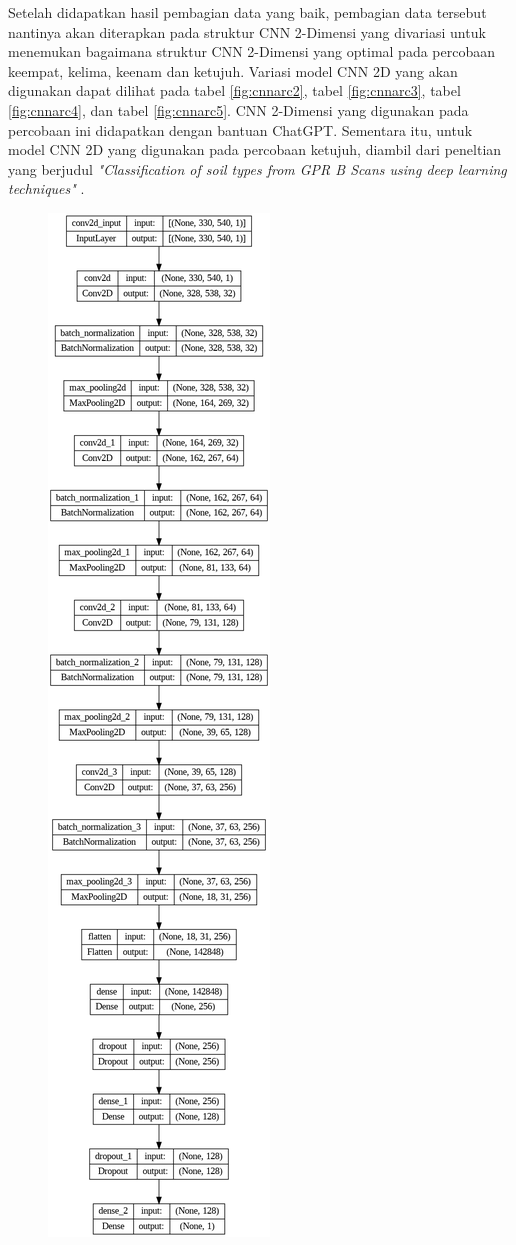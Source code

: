 Setelah didapatkan hasil pembagian data yang baik, pembagian data tersebut nantinya akan diterapkan pada struktur CNN 2-Dimensi yang divariasi untuk menemukan bagaimana struktur CNN 2-Dimensi yang optimal pada percobaan keempat, kelima, keenam dan ketujuh. Variasi model CNN 2D yang akan digunakan dapat dilihat pada tabel \ref{fig:cnnarc2}, tabel \ref{fig:cnnarc3}, tabel \ref{fig:cnnarc4}, dan tabel \ref{fig:cnnarc5}. CNN 2-Dimensi yang digunakan pada percobaan ini didapatkan dengan bantuan ChatGPT. Sementara itu, untuk model CNN 2D yang digunakan pada percobaan ketujuh, diambil dari peneltian yang berjudul \emph{"Classification of soil types from GPR B Scans using deep learning techniques"} \parencite{Barkataki2021}.

  \begin{figure} [H] \centering
    \includegraphics[scale=0.3]{gambar/bab3/cnnarc2.png}

\end{figure}
